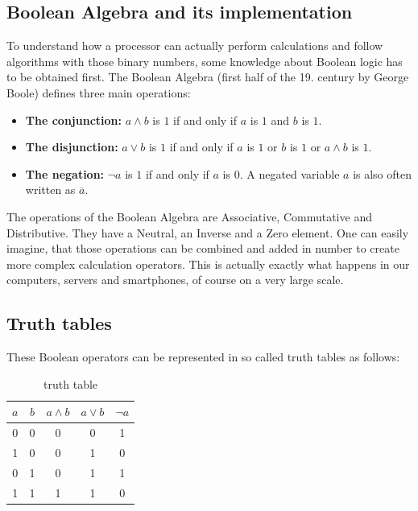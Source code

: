 \documentclass[10pt,a4paper]{article}
\begin{document}
\subsection{Boolean Algebra and its implementation}
To understand how a processor can actually perform calculations and follow algorithms with those binary numbers, some knowledge about Boolean logic has to be obtained first. The Boolean Algebra (first half of the 19. century by George Boole) defines three main operations: 

\begin{itemize}
 \item \textbf{The conjunction:} $a\land b$ is $1$ if and only if $a$ is $1$ and $b$ is $1$.\\
 \item \textbf{The disjunction:} $a\lor b$  is $1$ if and only if $a$ is $1$ or $b$ is $1$ or $a\wedge b$ is $1$.\\
 \item \textbf{The negation:}  $\neg a$ is $1$ if and only if $a$ is $0$. A negated variable $a$ is also often written as $\overline{a}$.
\end{itemize}

\noindent
The operations of the Boolean Algebra are Associative, Commutative and Distributive. They have a Neutral, an Inverse and a Zero element. One can easily imagine, that those operations can be combined and added in number to create more complex calculation operators. This is actually exactly what happens in our computers, servers and smartphones, of course on a very large scale. 
\subsection{Truth tables}
These Boolean operators can be represented in so called truth tables as follows:


\begin{table}[H]
\centering
\begin{tabular}{c|c|c|c|c}
\textbf{$a$} & \textbf{$b$} & \textbf{$a\land b$} & \textbf{$a\lor b$} & \textbf{$\neg a$} \\ \hline
0          & 0          & 0            & 0            & 1           \\
1          & 0          & 0            & 1            & 0           \\
0          & 1          & 0            & 1            & 1           \\
1          & 1          & 1            & 1            & 0          
\end{tabular}
\caption{truth table}
\label{tab:truth}
\end{table}
\end{document}
